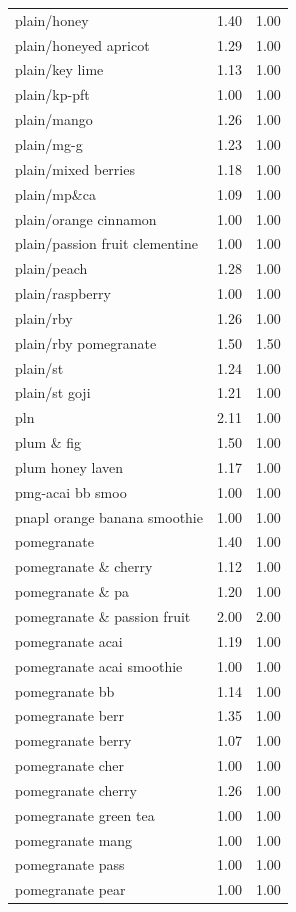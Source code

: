 \begin{table}
\begin{tabular}{lrr}
plain/honey & 1.40 & 1.00 \\
plain/honeyed apricot & 1.29 & 1.00 \\
plain/key lime & 1.13 & 1.00 \\
plain/kp-pft & 1.00 & 1.00 \\
plain/mango & 1.26 & 1.00 \\
plain/mg-g & 1.23 & 1.00 \\
plain/mixed berries & 1.18 & 1.00 \\
plain/mp\&ca & 1.09 & 1.00 \\
plain/orange cinnamon & 1.00 & 1.00 \\
plain/passion fruit clementine & 1.00 & 1.00 \\
plain/peach & 1.28 & 1.00 \\
plain/raspberry & 1.00 & 1.00 \\
plain/rby & 1.26 & 1.00 \\
plain/rby pomegranate & 1.50 & 1.50 \\
plain/st & 1.24 & 1.00 \\
plain/st goji & 1.21 & 1.00 \\
pln & 2.11 & 1.00 \\
plum \& fig & 1.50 & 1.00 \\
plum honey laven & 1.17 & 1.00 \\
pmg-acai bb smoo & 1.00 & 1.00 \\
pnapl orange banana smoothie & 1.00 & 1.00 \\
pomegranate & 1.40 & 1.00 \\
pomegranate \& cherry & 1.12 & 1.00 \\
pomegranate \& pa & 1.20 & 1.00 \\
pomegranate \& passion fruit & 2.00 & 2.00 \\
pomegranate acai & 1.19 & 1.00 \\
pomegranate acai smoothie & 1.00 & 1.00 \\
pomegranate bb & 1.14 & 1.00 \\
pomegranate berr & 1.35 & 1.00 \\
pomegranate berry & 1.07 & 1.00 \\
pomegranate cher & 1.00 & 1.00 \\
pomegranate cherry & 1.26 & 1.00 \\
pomegranate green tea & 1.00 & 1.00 \\
pomegranate mang & 1.00 & 1.00 \\
pomegranate pass & 1.00 & 1.00 \\
pomegranate pear & 1.00 & 1.00 \\

\end{tabular}
\end{table}
